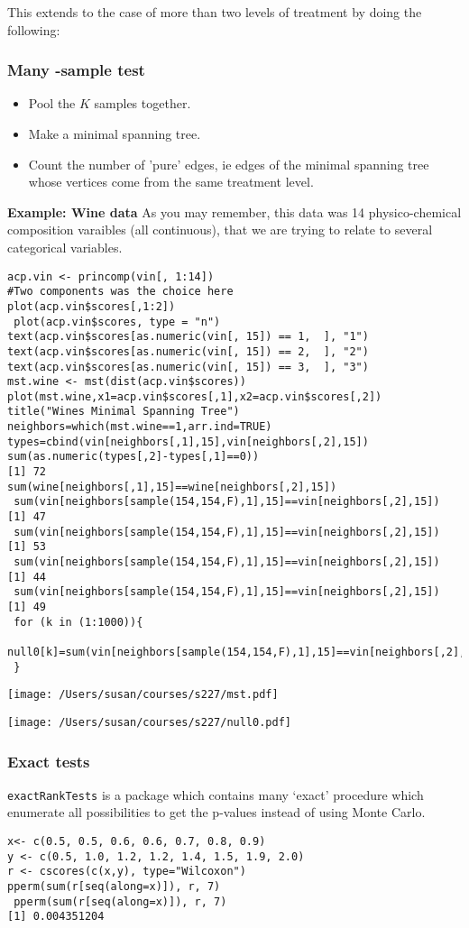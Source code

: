 \documentclass{article}
\begin{document}
This extends to the case of more than two levels
of treatment by doing the following:
\subsubsection*{Many -sample test}
\begin{itemize}
\item Pool the $K$ samples together.
\item Make a minimal spanning tree.
\item Count the number of 'pure' edges,
ie edges of the minimal spanning tree whose
vertices come from the same treatment level. 
\end{itemize}



{\bf Example: Wine data}
As you may remember, this data was 14 physico-chemical
composition varaibles (all continuous), that we are
trying to relate to several categorical variables.
{\small
\begin{verbatim}
acp.vin <- princomp(vin[, 1:14])
#Two components was the choice here
plot(acp.vin$scores[,1:2])
 plot(acp.vin$scores, type = "n")
text(acp.vin$scores[as.numeric(vin[, 15]) == 1,  ], "1")
text(acp.vin$scores[as.numeric(vin[, 15]) == 2,  ], "2")
text(acp.vin$scores[as.numeric(vin[, 15]) == 3,  ], "3")
mst.wine <- mst(dist(acp.vin$scores))
plot(mst.wine,x1=acp.vin$scores[,1],x2=acp.vin$scores[,2])
title("Wines Minimal Spanning Tree")
neighbors=which(mst.wine==1,arr.ind=TRUE)
types=cbind(vin[neighbors[,1],15],vin[neighbors[,2],15])
sum(as.numeric(types[,2]-types[,1]==0))
[1] 72
sum(wine[neighbors[,1],15]==wine[neighbors[,2],15])
 sum(vin[neighbors[sample(154,154,F),1],15]==vin[neighbors[,2],15])
[1] 47
 sum(vin[neighbors[sample(154,154,F),1],15]==vin[neighbors[,2],15])
[1] 53
 sum(vin[neighbors[sample(154,154,F),1],15]==vin[neighbors[,2],15])
[1] 44
 sum(vin[neighbors[sample(154,154,F),1],15]==vin[neighbors[,2],15])
[1] 49
 for (k in (1:1000)){
 null0[k]=sum(vin[neighbors[sample(154,154,F),1],15]==vin[neighbors[,2],15])
 }
\end{verbatim}
}
\begin{minipage}{3in}
\texttt{[image: /Users/susan/courses/s227/mst.pdf]}
\end{minipage}
\begin{minipage}{3in}
\texttt{[image: /Users/susan/courses/s227/null0.pdf]}
\end{minipage}
\subsubsection*{Exact tests}
{\tt exactRankTests} is a package which contains many `exact' procedure
which enumerate all possibilities to get the p-values instead of using Monte Carlo.
\begin{verbatim}
x<- c(0.5, 0.5, 0.6, 0.6, 0.7, 0.8, 0.9)
y <- c(0.5, 1.0, 1.2, 1.2, 1.4, 1.5, 1.9, 2.0)
r <- cscores(c(x,y), type="Wilcoxon")
pperm(sum(r[seq(along=x)]), r, 7)
 pperm(sum(r[seq(along=x)]), r, 7)
[1] 0.004351204
\end{verbatim}
\end{document}
